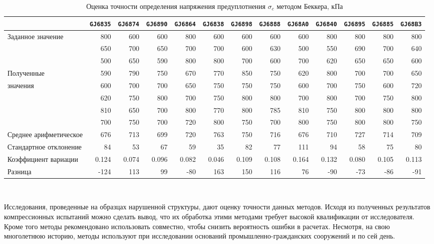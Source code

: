\begin{sidewaystable}[p]
    \centering
    \small
    \caption{Оценка точности определения напряжения предуплотнения $\sigma_c$ методом Беккера, кПа} \label{tab:accuracy-beck}
    \begin{tabular}{@{}lrrrrrrrrrrrr@{}}
    \toprule
    & \texttt{GJ6835} & \texttt{GJ6874} & \texttt{GJ6890} & \texttt{GJ6864} & \texttt{GJ6838} & \texttt{GJ6898} & \texttt{GJ6888} & \texttt{GJ68A0} & \texttt{GJ6840} & \texttt{GJ6895} & \texttt{GJ6885} & \texttt{GJ68B3} \\
    \midrule
    Заданное значение & 800 & 600 & 600 & 800 & 600 & 600 & 600 & 600 & 800 & 800 & 800 & 800 \\
    \midrule
     & 650 & 700 & 650 & 700 & 700 & 600 & 630 & 500 & 550 & 690 & 700 & 640 \\
     & 500 & 650 & 590 & 800 & 800 & 700 & 600 & 700 & 620 & 650 & 650 & 600 \\
    Полученные & 590 & 790 & 750 & 670 & 770 & 850 & 750 & 620 & 800 & 700 & 700 & 650 \\
    значения & 600 & 700 & 700 & 650 & 750 & 750 & 750 & 600 & 700 & 750 & 600 & 720 \\
     & 620 & 750 & 800 & 700 & 750 & 800 & 800 & 700 & 800 & 700 & 750 & 800 \\
     & 810 & 650 & 700 & 800 & 770 & 800 & 785 & 810 & 750 & 800 & 800 & 800 \\
     & 700 & 750 & 700 & 720 & 800 & 750 & 700 & 800 & 750 & 800 & 800 & 750 \\
    \midrule
    Среднее арифметическое & 676 & 713 & 699 & 720 & 763 & 750 & 716 & 676 & 710 & 727 & 714 & 709 \\
    Стандартное отклонение & 84 & 53 & 67 & 59 & 35 & 82 & 77 & 111 & 94 & 58 & 75 & 80 \\
    Коэффициент вариации & 0.124 & 0.074 & 0.096 & 0.082 & 0.046 & 0.109 & 0.108 & 0.164 & 0.132 & 0.080 & 0.105 & 0.113 \\
    \midrule
    Разница & -124 & 113 & 99 & -80 & 163 & 150 & 116 & 76 & -90 & -73 & -86 & -91 \\
    \bottomrule
    \end{tabular}
    \\ 
\end{sidewaystable}


Исследования, проведенные на образцах нарушенной структуры, дают оценку точности данных методов. Исходя из полученных результатов компрессионных испытаний можно сделать вывод, что их обработка этими методами требует высокой квалификации от исследователя. Кроме того методы рекомендовано использовать совместно, чтобы снизить вероятность ошибки в расчетах. Несмотря, на свою многолетнюю историю, методы используют при исследовании оснований промышленно-гражданских сооружений и по сей день. 

